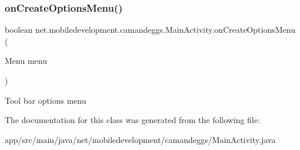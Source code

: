 \subsubsection{\texorpdfstring{on\+Create\+Options\+Menu()}{onCreateOptionsMenu()}}
{\footnotesize\ttfamily boolean net.\+mobiledevelopment.\+camandeggs.\+Main\+Activity.\+on\+Create\+Options\+Menu (\begin{DoxyParamCaption}\item[{Menu}]{menu }\end{DoxyParamCaption})}

Tool bar options menu 

The documentation for this class was generated from the following file\+:\begin{DoxyCompactItemize}
\item 
app/src/main/java/net/mobiledevelopment/camandeggs/Main\+Activity.\+java\end{DoxyCompactItemize}
